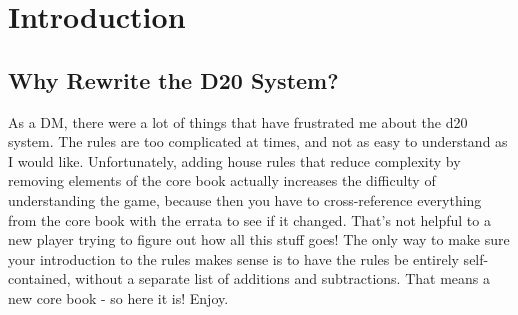 \chapter{Introduction}
\section{Why Rewrite the D20 System?}
As a DM, there were a lot of things that have frustrated me about the d20 system. The rules are too complicated at times, and not as easy to understand as I would like. Unfortunately, adding house rules that reduce complexity by removing elements of the core book actually increases the difficulty of understanding the game, because then you have to cross-reference everything from the core book with the errata to see if it changed. That's not helpful to a new player trying to figure out how all this stuff goes! The only way to make sure your introduction to the rules makes sense is to have the rules be entirely self-contained, without a separate list of additions and subtractions. That means a new core book - so here it is! Enjoy.